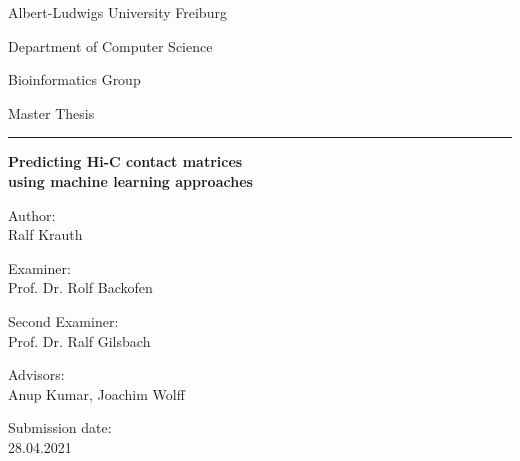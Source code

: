 %
\begin{titlepage}
 \centering
 Albert-Ludwigs University Freiburg
 
 Department of Computer Science
 
 Bioinformatics Group
 \vspace{4cm}
 
  Master Thesis
 \vspace{3mm} 
  
 \huge \hrule \vspace{5mm}
 \textbf{Predicting Hi-C contact matrices \\ using machine learning approaches}
 
 \hrulefill
 
 \vfill
 \raggedright
 \normalsize
  Author:\\
  Ralf Krauth 
  
  Examiner:\\
  Prof. Dr. Rolf Backofen
  
  Second Examiner:\\
  Prof. Dr. Ralf Gilsbach
  
  Advisors:\\
  Anup Kumar, Joachim Wolff
  
  Submission date:\\
  28.04.2021

\end{titlepage}
